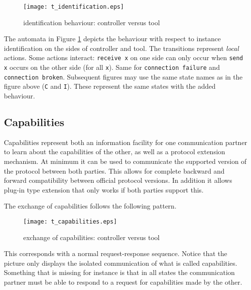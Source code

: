 \documentclass{article}
\begin{document}
   \begin{figure}[H]
    \begin{center}
     \texttt{[image: t\_identification.eps]}
    \end{center}
    \vspace{-0.3cm}
    \caption{identification behaviour: controller versus tool}
    \label{fig::identification}
   \end{figure}

   \noindent The automata in Figure \ref{fig::identification} depicts the
   behaviour with respect to instance identification on the sides of controller
   and tool. The transitions represent \emph{local} actions. Some actions
   interact: \verb'receive x' on one side can only occur when \verb'send x'
   occurs on the other side (for all \verb'x'). Same for \verb'connection failure'
   and \verb'connection broken'.  Subsequent figures may use the same state
   names as in the figure above (\verb'C' and \verb'I'). These represent the
   same states with the added behaviour.

  \subsection{Capabilities}

   Capabilities represent both an information facility for one communication
   partner to learn about the capabilities of the other, as well as a protocol
   extension mechanism.  At minimum it can be used to communicate the supported
   version of the protocol between both parties. This allows for complete
   backward and forward compatibility between official protocol versions. In
   addition it allows plug-in type extension that only works if both parties
   support this.
   
   The exchange of capabilities follows the following pattern.
   
   \begin{figure}[H]
    \begin{center}
     \texttt{[image: t\_capabilities.eps]}
    \end{center}
    \vspace{-0.3cm}
    \caption{exchange of capabilities: controller versus tool}
   \end{figure}

   \noindent This corresponds with a normal request-response sequence.  Notice
   that the picture only displays the isolated communication of what is called
   capabilities. Something that is missing for instance is that in all states
   the communication partner must be able to respond to a request for
   capabilities made by the other.
\end{document}
